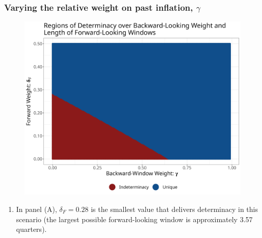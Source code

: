 \documentclass{beamer}
\begin{document}
\begin{frame}
	\frametitle{Varying the relative weight on past inflation, $\gamma$}	
	\begin{center}		
		\begin{figure}%
			\includegraphics[width=\textwidth,height=0.5\textheight,keepaspectratio]{../code/gamma_deltaF.png}
		\end{figure}%
		\end{center}%
		\begin{enumerate}
			\setlength{\itemsep}{1em}
			\item In panel (A), $\delta_F =0.28$ is the smallest value that delivers determinacy in this scenario (the largest possible forward-looking window is approximately 3.57 quarters).
		\end{enumerate}
\end{frame}
\end{document}

